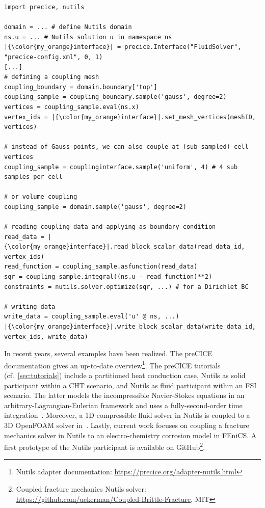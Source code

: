 \begin{listing}[h!]
\caption{A simplified coupled Nutils code. Due to the rich and flexible API of Nutils, defining coupling meshes and accessing coupling data are simple tasks, rendering a stand-alone Nutils-preCICE adapter unnecessary.}
\small
\label{code:nutils}
\begin{verbatim}
import precice, nutils

domain = ... # define Nutils domain
ns.u = ... # Nutils solution u in namespace ns 
|{\color{my_orange}interface}| = precice.Interface("FluidSolver", "precice-config.xml", 0, 1)
[...]
# defining a coupling mesh
coupling_boundary = domain.boundary['top']
coupling_sample = coupling_boundary.sample('gauss', degree=2)
vertices = coupling_sample.eval(ns.x)
vertex_ids = |{\color{my_orange}interface}|.set_mesh_vertices(meshID, vertices)

# instead of Gauss points, we can also couple at (sub-sampled) cell vertices
coupling_sample = couplinginterface.sample('uniform', 4) # 4 sub samples per cell

# or volume coupling
coupling_sample = domain.sample('gauss', degree=2)
 
# reading coupling data and applying as boundary condition
read_data = |{\color{my_orange}interface}|.read_block_scalar_data(read_data_id, vertex_ids)
read_function = coupling_sample.asfunction(read_data)
sqr = coupling_sample.integral((ns.u - read_function)**2) 
constraints = nutils.solver.optimize(sqr, ...) # for a Dirichlet BC

# writing data
write_data = coupling_sample.eval('u' @ ns, ...)
|{\color{my_orange}interface}|.write_block_scalar_data(write_data_id, vertex_ids, write_data)
\end{verbatim}
\end{listing}

In recent years, several examples have been realized. The preCICE documentation gives an up-to-date overview\footnote{Nutils adapter documentation: \url{https://precice.org/adapter-nutils.html}}. The preCICE tutorials (cf.~\autoref{sec:tutorials}) include a partitioned heat conduction case, Nutils as solid participant within a CHT scenario, and Nutils as fluid participant within an FSI scenario. The latter models the incompressible Navier-Stokes equations in an arbitrary-Lagrangian-Eulerian framework and uses a fully-second-order time integration~\cite{QNWI}. 
Moreover, a 1D compressible fluid solver in Nutils is coupled to a 3D OpenFOAM solver in~\cite{Chourdakis2019_OFW14}. Lastly, current work focuses on coupling a fracture mechanics solver in Nutils to an electro-chemistry corrosion model in FEniCS. A first prototype of the Nutils participant is available on GitHub\footnote{Coupled fracture mechanics Nutils solver: \url{https://github.com/uekerman/Coupled-Brittle-Fracture}, MIT}. 

